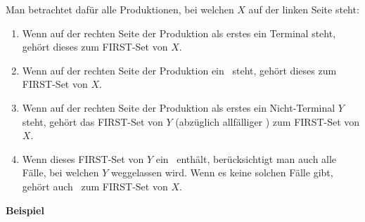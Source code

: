 Man betrachtet dafür alle Produktionen, bei welchen $X$ auf der linken Seite steht:

\begin{enumerate}
	\item Wenn auf der rechten Seite der Produktion als erstes ein Terminal steht, gehört dieses
		zum FIRST-Set von $X$.
	\item Wenn auf der rechten Seite der Produktion ein \textepsilon\ steht, gehört dieses zum
		FIRST-Set von $X$.
	\item Wenn auf der rechten Seite der Produktion als erstes ein Nicht-Terminal $Y$ steht, gehört
		das FIRST-Set von $Y$ (abzüglich allfälliger \textepsilon) zum FIRST-Set von $X$.
	\item Wenn dieses FIRST-Set von $Y$ ein \textepsilon\ enthält, berücksichtigt man auch alle Fälle,
		bei welchen $Y$ weggelassen wird. Wenn es keine solchen Fälle gibt, gehört auch
		\textepsilon\ zum FIRST-Set von $X$.
\end{enumerate}

\textbf{Beispiel}

